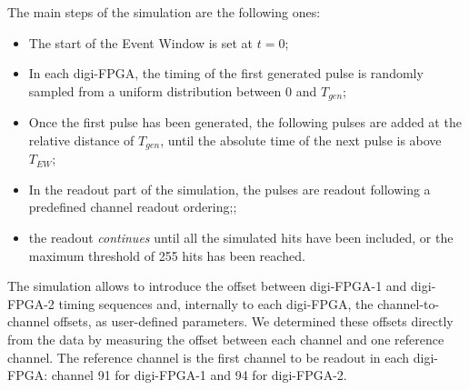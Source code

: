 The main steps of the simulation are the following ones:
\begin{itemize}
\item
  The start of the Event Window is set at $t=0$;
\item
  In each digi-FPGA, the timing of the first generated pulse 
  is randomly sampled from a uniform distribution between 0 and $T_{gen}$;
\item
Once the first pulse has been generated, the following pulses are 
added at the relative distance of $T_{gen}$,
  until the absolute time of the next pulse is above $T_{EW}$;
\item
  In the readout part of the simulation, 
  the pulses are readout following a predefined channel readout ordering;; 
\item
  the readout \textit{continues} until all the simulated hits 
  have been included, or the maximum threshold of 255 hits has been reached.
\end{itemize}
The simulation allows to introduce the offset between digi-FPGA-1 
and digi-FPGA-2 timing sequences and, 
internally to each digi-FPGA, the channel-to-channel 
offsets, as user-defined parameters.
We determined these offsets directly from the 
data by measuring the 
offset between each channel and one reference channel.
The reference channel is the first channel to 
be readout in each digi-FPGA: channel 91 for 
digi-FPGA-1 and 94 for digi-FPGA-2. 

